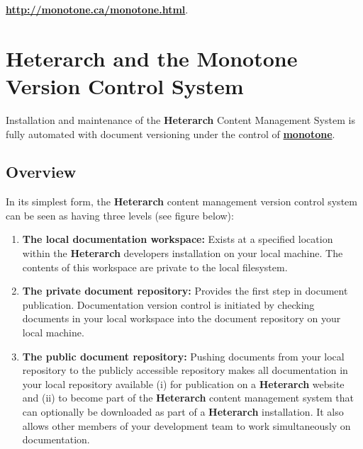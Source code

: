\documentclass[12pt]{article}
\begin{document}
\href{http://monotone.ca/monotone.html}{\bf http://monotone.ca/monotone.html}.

\section*{Heterarch and the Monotone Version Control System}

Installation and maintenance of the {\bf\small{Heterarch}} Content Management System is fully automated with document versioning under the control of \href{http://monotone.ca/}{\bf monotone}. 

\subsection*{Overview}

In its simplest form, the {\bf\small{Heterarch}} content management version control system can be seen as having three levels (see figure below):
\begin{enumerate}

\item {\bf The local documentation workspace:} Exists at a specified location within the {\bf\small{Heterarch}} developers installation on your local machine. The contents of this workspace are private to the local filesystem.

\item {\bf The private document repository:} Provides the first step in document publication. Documentation version control is initiated by checking documents in your local workspace into the document repository on your local machine.

\item {\bf The public document repository:} Pushing documents from your local repository to the publicly accessible repository makes all documentation in your local repository available (i) for publication on a {\bf\small{Heterarch}} website and (ii) to become part of the {\bf\small{Heterarch}} content management system that can optionally be downloaded as part of a {\bf\small{Heterarch}} installation. It also allows other members of your development team to work simultaneously on documentation.

\end{enumerate}
\end{document}

